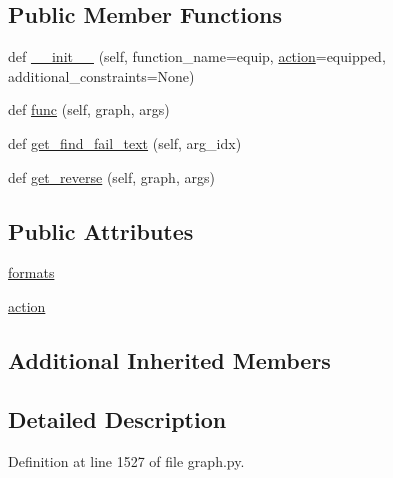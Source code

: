 \subsection*{Public Member Functions}
\begin{DoxyCompactItemize}
\item 
def \hyperlink{classlight__chats_1_1graph_1_1EquipObjectFunction_ae9d5525c470e81b3cd05871ceb0bfc36}{\+\_\+\+\_\+init\+\_\+\+\_\+} (self, function\+\_\+name=\textquotesingle{}equip\textquotesingle{}, \hyperlink{classlight__chats_1_1graph_1_1EquipObjectFunction_a43535bde5e33eb613bddfe618f4a4ef6}{action}=\textquotesingle{}equipped\textquotesingle{}, additional\+\_\+constraints=None)
\item 
def \hyperlink{classlight__chats_1_1graph_1_1EquipObjectFunction_a4eaec48030f12c92dcddf9f976b31604}{func} (self, graph, args)
\item 
def \hyperlink{classlight__chats_1_1graph_1_1EquipObjectFunction_a63956c69d130eb078d3c987b8b220190}{get\+\_\+find\+\_\+fail\+\_\+text} (self, arg\+\_\+idx)
\item 
def \hyperlink{classlight__chats_1_1graph_1_1EquipObjectFunction_aa6c4d9ced2e8732087350592441e82bd}{get\+\_\+reverse} (self, graph, args)
\end{DoxyCompactItemize}
\subsection*{Public Attributes}
\begin{DoxyCompactItemize}
\item 
\hyperlink{classlight__chats_1_1graph_1_1EquipObjectFunction_a798cbf33f30601ca3ac770b472ddbe6c}{formats}
\item 
\hyperlink{classlight__chats_1_1graph_1_1EquipObjectFunction_a43535bde5e33eb613bddfe618f4a4ef6}{action}
\end{DoxyCompactItemize}
\subsection*{Additional Inherited Members}


\subsection{Detailed Description}
\begin{DoxyVerb}\end{DoxyVerb}
 

Definition at line 1527 of file graph.\+py.



